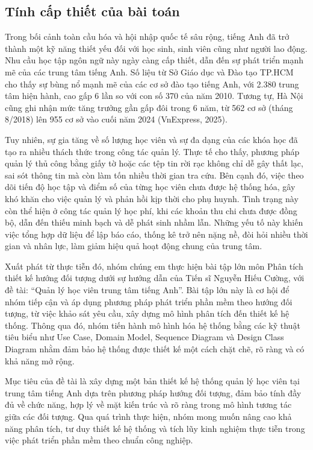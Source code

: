 \documentclass[12pt,a4paper]{article}
\begin{document}
\setcounter{subsection}{0}

\subsection*{Tính cấp thiết của bài toán}

Trong bối cảnh toàn cầu hóa và hội nhập quốc tế sâu rộng, tiếng Anh đã trở thành một kỹ năng thiết yếu đối với học sinh, sinh viên cũng như người lao động. Nhu cầu học tập ngôn ngữ này ngày càng cấp thiết, dẫn đến sự phát triển mạnh mẽ của các trung tâm tiếng Anh. Số liệu từ Sở Giáo dục và Đào tạo TP.HCM cho thấy sự bùng nổ mạnh mẽ của các cơ sở đào tạo tiếng Anh, với 2.380 trung tâm hiện hành, cao gấp 6 lần so với con số 370 của năm 2010. Tương tự, Hà Nội cũng ghi nhận mức tăng trưởng gần gấp đôi trong 6 năm, từ 562 cơ sở (tháng 8/2018) lên 955 cơ sở vào cuối năm 2024 (VnExpress, 2025).

Tuy nhiên, sự gia tăng về số lượng học viên và sự đa dạng của các khóa học đã tạo ra nhiều thách thức trong công tác quản lý. Thực tế cho thấy, phương pháp quản lý thủ công bằng giấy tờ hoặc các tệp tin rời rạc không chỉ dễ gây thất lạc, sai sót thông tin mà còn làm tốn nhiều thời gian tra cứu. Bên cạnh đó, việc theo dõi tiến độ học tập và điểm số của từng học viên chưa được hệ thống hóa, gây khó khăn cho việc quản lý và phản hồi kịp thời cho phụ huynh. Tình trạng này còn thể hiện ở công tác quản lý học phí, khi các khoản thu chi chưa được đồng bộ, dẫn đến thiếu minh bạch và dễ phát sinh nhầm lẫn. Những yếu tố này khiến việc tổng hợp dữ liệu để lập báo cáo, thống kê trở nên nặng nề, đòi hỏi nhiều thời gian và nhân lực, làm giảm hiệu quả hoạt động chung của trung tâm.

Xuất phát từ thực tiễn đó, nhóm chúng em thực hiện bài tập lớn môn Phân tích thiết kế hướng đối tượng dưới sự hướng dẫn của Tiến sĩ Nguyễn Hiếu Cường, với đề tài: “Quản lý học viên trung tâm tiếng Anh”. Bài tập lớn này là cơ hội để nhóm tiếp cận và áp dụng phương pháp phát triển phần mềm theo hướng đối tượng, từ việc khảo sát yêu cầu, xây dựng mô hình phân tích đến thiết kế hệ thống. Thông qua đó, nhóm tiến hành mô hình hóa hệ thống bằng các kỹ thuật tiêu biểu như Use Case, Domain Model, Sequence Diagram và Design Class Diagram nhằm đảm bảo hệ thống được thiết kế một cách chặt chẽ, rõ ràng và có khả năng mở rộng.

Mục tiêu của đề tài là xây dựng một bản thiết kế hệ thống quản lý học viên tại trung tâm tiếng Anh dựa trên phương pháp hướng đối tượng, đảm bảo tính đầy đủ về chức năng, hợp lý về mặt kiến trúc và rõ ràng trong mô hình tương tác giữa các đối tượng. Qua quá trình thực hiện, nhóm mong muốn nâng cao khả năng phân tích, tư duy thiết kế hệ thống và tích lũy kinh nghiệm thực tiễn trong việc phát triển phần mềm theo chuẩn công nghiệp.
\end{document}
